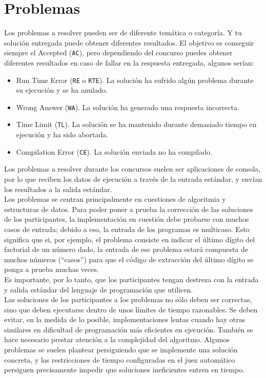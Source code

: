 \chapter{Problemas}
\label{ch:problemas}

Los problemas a resolver pueden ser de diferente temática o
categoría. Y tu solución entregada puede obtener diferentes
resultados. El objetivo es conseguir siempre el Accepted (\texttt{AC}), pero
dependiendo del concurso puedes obtener diferentes resultados en caso
de fallar en la respuesta entregada, algunos serían:

\begin{itemize}
\item Run Time Error (\texttt{RE} o \texttt{RTE}). La solución ha
  sufrido algún problema durante su ejecución y se ha anulado.
\item Wrong Answer (\texttt{WA}). La solución ha generado una
  respuesta incorrecta.
\item Time Limit (\texttt{TL}). La solución se ha mantenido durante
  demasiado tiempo en ejecución y ha sido abortada.
\item Compilation Error (\texttt{CE}). La solución enviada no ha
  compilado.
\end{itemize}

Los problemas a resolver durante los concursos suelen ser aplicaciones
de consola, por lo que reciben los datos de ejecución a través de la
entrada estándar, y envían los resultados a la salida estándar.\\

Los problemas se centran principalmente en cuestiones de algoritmia y
estructuras de datos. Para poder poner a prueba la corrección de las
soluciones de los participantes, la implementación en cuestión debe
probarse con muchos casos de entrada; debido a eso, la entrada de los
programas es multicaso. Esto significa que si, por ejemplo, el
problema consiste en indicar el último dígito del factorial de un
número dado, la entrada de ese problema estará compuesta de muchos
números (``casos'') para que el código de extracción del último dígito
se ponga a prueba muchas veces.\\

Es importante, por lo tanto, que los participantes tengan destreza con
la entrada y salida estándar del lenguaje de programación que
utilicen.\\

Las soluciones de los participantes a los problemas no sólo deben ser
correctas, sino que deben ejecutarse dentro de unos límites de tiempo
razonables. Se deben evitar, en la medida de lo posible,
implementaciones lentas cuando hay otras similares en dificultad de
programación más eficientes en ejecución. También se hace necesario
prestar atención a la complejidad del algoritmo. Algunos problemas se
suelen plantear persiguiendo que se implemente una solución concreta,
y las restricciones de tiempo configuradas en el juez automático
persiguen precisamente impedir que soluciones ineficientes entren en
tiempo.\\

